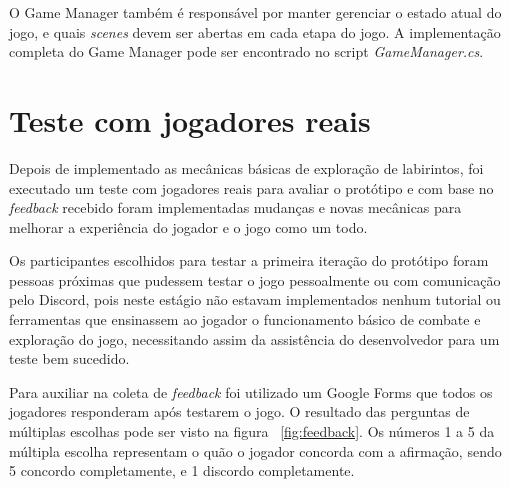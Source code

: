 \documentclass[
	12pt,				%
	openright,			%
	twoside,			%
	a4paper,			%
	english,			%
	french,				%
	spanish,			%
	brazil				%
	]{abntex2}
\begin{document}
	O Game Manager também é responsável por manter gerenciar o estado atual do jogo, e quais \emph{scenes} devem ser abertas em cada etapa do jogo. A implementação completa do Game Manager pode ser encontrado no script \emph{GameManager.cs}.
	
\section{Teste com jogadores reais}

	Depois de implementado as mecânicas básicas de exploração de labirintos, foi executado um teste com jogadores reais para avaliar o protótipo e com base no \emph{feedback} recebido foram implementadas mudanças e novas mecânicas para melhorar a experiência do jogador e o jogo como um todo.
	
	Os participantes escolhidos para testar a primeira iteração do protótipo foram pessoas próximas que pudessem testar o jogo pessoalmente ou com comunicação pelo Discord, pois neste estágio não estavam implementados nenhum tutorial ou ferramentas que ensinassem ao jogador o funcionamento básico de combate e exploração do jogo, necessitando assim da assistência do desenvolvedor para um teste bem sucedido.

	Para auxiliar na coleta de \emph{feedback} foi utilizado um Google Forms que todos os jogadores responderam após testarem o jogo. O resultado das perguntas de múltiplas escolhas pode ser visto na figura ~\ref{fig:feedback}. Os números 1 a 5 da múltipla escolha representam o quão o jogador concorda com a afirmação, sendo 5 concordo completamente, e 1 discordo completamente.
\pagebreak
\end{document}
